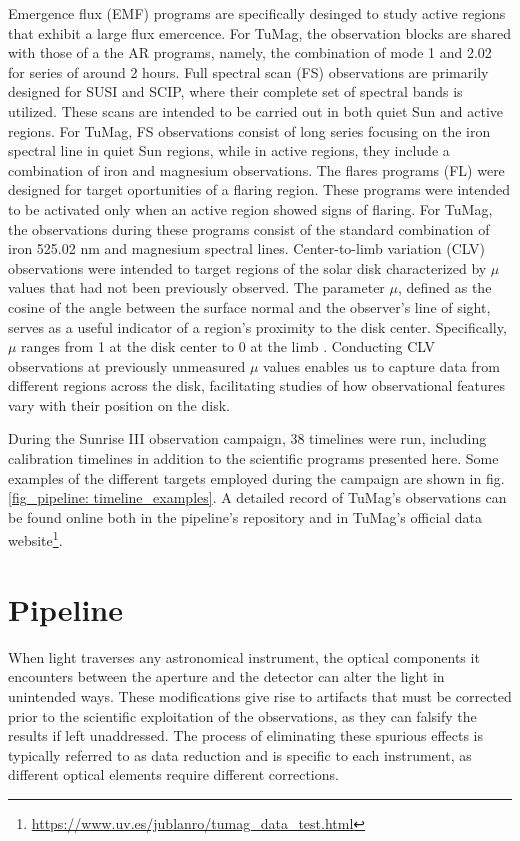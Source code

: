 \begin{itemize}
  \Myitem Emergence flux (EMF) programs are specifically desinged to study active regions that exhibit a large flux emercence. For TuMag, the observation blocks are shared with those of a the AR programs, namely, the combination of mode 1 and 2.02 for series of around 2 hours. 
  \Myitem Full spectral scan (FS) observations are primarily designed for SUSI and SCIP, where their complete set of spectral bands is utilized. These scans are intended to be carried out in both quiet Sun and active regions. For TuMag, FS observations consist of long series focusing on the iron spectral line in quiet Sun regions, while in active regions, they include a combination of iron and magnesium observations.
  \Myitem The flares programs (FL) were designed for target oportunities of a flaring region. These programs were intended to be activated only when an active region showed signs of flaring. For TuMag, the observations during these programs consist of the standard combination of iron 525.02 nm and magnesium spectral lines.
  \Myitem Center-to-limb variation (CLV) observations were intended to target regions of the solar disk characterized by $\mu$ values that had not been previously observed. The parameter $\mu$, defined as the cosine of the angle between the surface normal and the observer's line of sight, serves as a useful indicator of a region's proximity to the disk center. Specifically, $\mu$ ranges from 1 at the disk center to 0 at the limb \citep{thompson2006coordinate}. Conducting CLV observations at previously unmeasured $\mu$ values enables us to capture data from different regions across the disk, facilitating studies of how observational features vary with their position on the disk. 
\end{itemize}

During the Sunrise III observation campaign, 38 timelines were run, including calibration timelines in addition to the scientific programs presented here. Some examples of the different targets employed during the campaign are shown in fig. \ref{fig_pipeline: timeline_examples}.  A detailed record of TuMag's observations can be found online both in the pipeline's repository and in TuMag's official data website\footnote{\url{https://www.uv.es/jublanro/tumag_data_test.html}}.  

\section{Pipeline}

When light traverses any astronomical instrument, the optical components it encounters between the aperture and the detector can alter the light in unintended ways. These modifications give rise to artifacts that must be corrected prior to the scientific exploitation of the observations, as they can falsify the results if left unaddressed. The process of eliminating these spurious effects is typically referred to as data reduction and is specific to each instrument, as different optical elements require different corrections.

